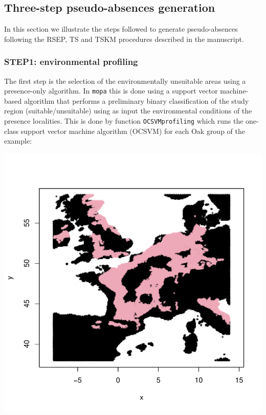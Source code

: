 \documentclass[10pt,a4paper]{article}
\begin{document}
\subsection{Three-step pseudo-absences generation}

In this section we illustrate the steps followed to generate pseudo-absences following the RSEP, TS and TSKM procedures described in the manuscript. 

\subsubsection{STEP1: environmental profiling}

The first step is the selection of the environmentally unsuitable areas using a presence-only algorithm. In \texttt{mopa} this is done using a support vector machine-based algorithm that performs a preliminary binary classification of the study region (suitable/unsuitable) using as input the environmental conditions of the presence localities. This is done by function \texttt{OCSVMprofiling} which runs the one-class support vector machine algorithm (OCSVM) for each Oak group of the example:

\begin{Schunk}
\end{Schunk}
\includegraphics{mopa-mopa7}
\end{document}
